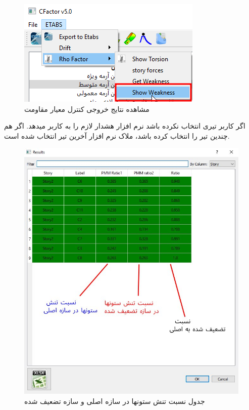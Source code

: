 \begin{figure}[H]
    \centering
    \includegraphics[scale=.7]{figures/show_weakness}
    \caption{مشاهده نتایج خروجی کنترل معیار مقاومت}
    \label{pic:show_weakness}
    
\end{figure}

اگر کاربر تیری انتخاب نکرده باشد نرم افزار هشدار لازم را به کاربر میدهد. اگر هم چندین تیر را انتخاب کرده باشد، ملاک نرم افزار آخرین تیر انتخاب شده است.

\begin{figure}
    \centering
    \includegraphics[scale=.7]{figures/weakness_column}
    \caption{جدول نسبت تنش ستونها در سازه اصلی و سازه تضعیف شده}
    \label{pic:weakness_column}
\end{figure}

